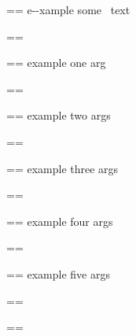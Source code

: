 \documentclass{book}
\makeatletter
\newenvironment{Texinfopreformatted}{%
  \par\GNUTobeylines\obeyspaces\frenchspacing\parskip=\z@\parindent=\z@}{}
{\catcode`\^^M=13 \gdef\GNUTobeylines{\catcode`\^^M=13 \def^^M{\null\par}}}
\newenvironment{Texinfoindented}{\begin{list}{}{}\item\relax}{\end{list}}
\renewcommand{\_}{\Texinfounderscore\discretionary{}{}{}}
\makeatother
\begin{document}
\begin{Texinfoindented}
\begin{Texinfoindented}
\begin{Texinfopreformatted}
\ttfamily e{-}{-}xample  some
\   text
\end{Texinfopreformatted}
\end{Texinfoindented}
\begin{Texinfopreformatted}%
\ttfamily 
\end{Texinfopreformatted}
\begin{Texinfoindented}
\begin{Texinfopreformatted}%
\ttfamily example one arg
\end{Texinfopreformatted}
\end{Texinfoindented}
\begin{Texinfopreformatted}%
\ttfamily 
\end{Texinfopreformatted}
\begin{Texinfoindented}
\begin{Texinfopreformatted}%
\ttfamily example two args
\end{Texinfopreformatted}
\end{Texinfoindented}
\begin{Texinfopreformatted}%
\ttfamily 
\end{Texinfopreformatted}
\begin{Texinfoindented}
\begin{Texinfopreformatted}%
\ttfamily example three args
\end{Texinfopreformatted}
\end{Texinfoindented}
\begin{Texinfopreformatted}%
\ttfamily 
\end{Texinfopreformatted}
\begin{Texinfoindented}
\begin{Texinfopreformatted}%
\ttfamily example four args
\end{Texinfopreformatted}
\end{Texinfoindented}
\begin{Texinfopreformatted}%
\ttfamily 
\end{Texinfopreformatted}
\begin{Texinfoindented}
\begin{Texinfopreformatted}%
\ttfamily example five args
\end{Texinfopreformatted}
\end{Texinfoindented}
\begin{Texinfopreformatted}%
\ttfamily 
\end{Texinfopreformatted}
\begin{Texinfoindented}
\begin{Texinfopreformatted}%

\end{Texinfopreformatted}
\end{Texinfoindented}
\end{Texinfoindented}
\end{document}
